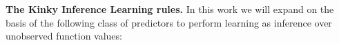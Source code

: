%




\textbf{The Kinky Inference Learning rules.}
In this work we will expand on the basis of the following class of predictors to perform learning as inference over unobserved function values:

